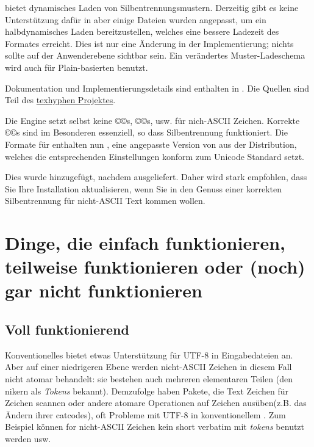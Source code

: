 \documentclass{lltxdoc}
\begin{document}
\luatex bietet dynamisches Laden von Silbentrennungsmustern. Derzeitig gibt es 
keine Unterstützung dafür in  aber einige Dateien wurden angepasst, 
um ein halbdynamisches Laden bereitzustellen, welches eine bessere Ladezeit des 
Formates erreicht. Dies ist nur eine Änderung in der Implementierung; nichts 
sollte auf der Anwenderebene sichtbar sein. Ein verändertes Muster-Ladeschema 
wird auch für Plain-basierten benutzt.

Dokumentation und Implementierungsdetails sind enthalten in 
. Die Quellen sind Teil des 
\href{http://tug.org/tex-hyphen/}{texhyphen Projektes}.

Die Engine setzt selbst keine ©\catcode©s, ©\lccode©s, usw. für nich-ASCII 
Zeichen. Korrekte ©\lccode©s sind im Besonderen essenziell, so dass 
Silbentrennung funktioniert. Die Formate für \luatex enthalten nun 
, eine angepasste Version von 
 aus der \xetex Distribution, welches die 
entsprechenden Einstellungen konform zum Unicode Standard setzt.

Dies wurde hinzugefügt, nachdem  ausgeliefert. Daher wird stark 
empfohlen, dass Sie Ihre Installation aktualisieren, wenn Sie in den Genuss 
einer korrekten Silbentrennung für nicht-ASCII Text kommen wollen.

\section{Dinge, die einfach funktionieren, teilweise funktionieren oder (noch) 
gar nicht funktionieren}
\label{workornot}

\subsection{Voll funktionierend}\label{working}

Konventionelles \latex bietet etwas Unterstützung für UTF-8 in Eingabedateien 
an. Aber auf einer niedrigeren Ebene werden nicht-ASCII Zeichen in diesem Fall 
nicht atomar behandelt: sie bestehen auch mehreren elementaren Teilen 
(den \tex{}nikern als  \emph{Tokens} bekannt). Demzufolge haben Pakete, 
die Text Zeichen für Zeichen scannen oder andere atomare Operationen auf Zeichen
 ausüben(z.B. das Ändern ihrer catcodes), oft Probleme mit UTF-8 in 
konventionellem \latex. Zum Beispiel können for nicht-ASCII Zeichen kein short 
verbatim mit \emph{tokens} benutzt werden usw.
\end{document}
